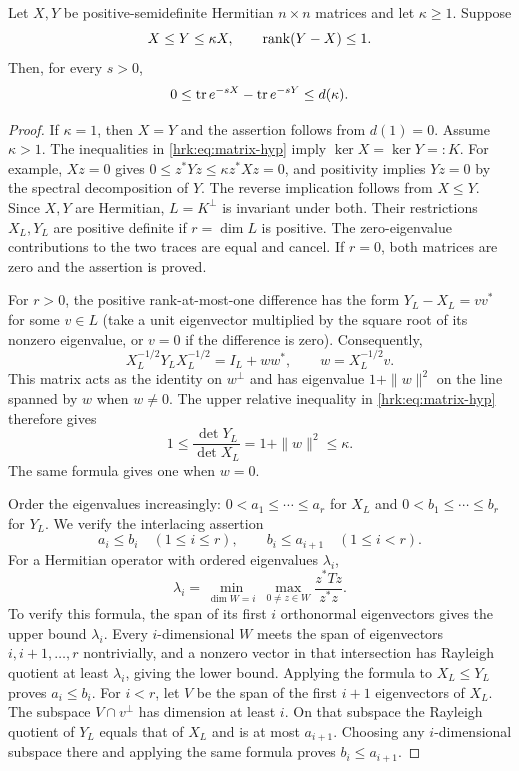 \begin{hrklemma}\label{hrk:lem:matrix}
Let $X,Y$ be positive-semidefinite Hermitian $n\times n$ matrices and
let $\kappa\geq1$. Suppose
\begin{equation}\label{hrk:eq:matrix-hyp}
 X\leq Y\leq\kappa X,\qquad \operatorname{rank}(Y-X)\leq1.
\end{equation}
Then, for every $s>0$,
\begin{equation}\label{hrk:eq:one-sided}
 0\leq\operatorname{tr} e^{-sX}-\operatorname{tr} e^{-sY}\leq d(\kappa).
\end{equation}
\end{hrklemma}
\begin{proof}
If $\kappa=1$, then $X=Y$ and the assertion follows from $d(1)=0$.
Assume $\kappa>1$. The inequalities in \eqref{hrk:eq:matrix-hyp} imply
$\ker X=\ker Y=:K$. For example, $Xz=0$ gives
$0\leq z^*Yz\leq\kappa z^*Xz=0$, and positivity implies $Yz=0$
by the spectral decomposition of $Y$. The reverse implication follows
from $X\leq Y$. Since $X,Y$ are Hermitian, $L=K^\perp$ is invariant
under both. Their restrictions $X_L,Y_L$ are positive definite if
$r=\dim L$ is positive. The zero-eigenvalue contributions to the two
traces are equal and cancel. If $r=0$, both matrices are zero and
the assertion is proved.

For $r>0$, the positive rank-at-most-one difference has the form
$Y_L-X_L=vv^*$ for some $v\in L$ (take a unit eigenvector multiplied
by the square root of its nonzero eigenvalue, or $v=0$ if the
difference is zero). Consequently,
\[
 X_L^{-1/2}Y_LX_L^{-1/2}=I_L+ww^*,\qquad
 w=X_L^{-1/2}v.
\]
This matrix acts as the identity on $w^\perp$ and has eigenvalue
$1+\|w\|^2$ on the line spanned by $w$ when $w\ne0$.
The upper relative inequality in \eqref{hrk:eq:matrix-hyp} therefore gives
\begin{equation}\label{hrk:eq:det-bound}
 1\leq\frac{\det Y_L}{\det X_L}
       =1+\|w\|^2\leq\kappa.
\end{equation}
The same formula gives one when $w=0$.

Order the eigenvalues increasingly:
$0<a_1\leq\cdots\leq a_r$ for $X_L$ and
$0<b_1\leq\cdots\leq b_r$ for $Y_L$.
We verify the interlacing assertion
\begin{equation}\label{hrk:eq:interlacing}
 a_i\leq b_i\quad(1\leq i\leq r),\qquad
 b_i\leq a_{i+1}\quad(1\leq i<r).
\end{equation}
For a Hermitian operator with ordered eigenvalues $\lambda_i$,
\[
 \lambda_i=\min_{\dim W=i}\ \max_{0\ne z\in W}
                   \frac{z^*Tz}{z^*z}.
\]
To verify this formula, the span of its first $i$ orthonormal
eigenvectors gives the upper bound $\lambda_i$. Every $i$-dimensional
$W$ meets the span of eigenvectors $i,i+1,\ldots,r$ nontrivially,
and a nonzero vector in that intersection has Rayleigh quotient at
least $\lambda_i$, giving the lower bound. Applying the formula to
$X_L\leq Y_L$ proves $a_i\leq b_i$. For $i<r$, let $V$ be the span
of the first $i+1$ eigenvectors of $X_L$. The subspace
$V\cap v^\perp$ has dimension at least $i$. On that subspace the
Rayleigh quotient of $Y_L$ equals that of $X_L$ and is at most
$a_{i+1}$. Choosing any $i$-dimensional subspace there and applying
the same formula proves $b_i\leq a_{i+1}$.


\end{proof}
